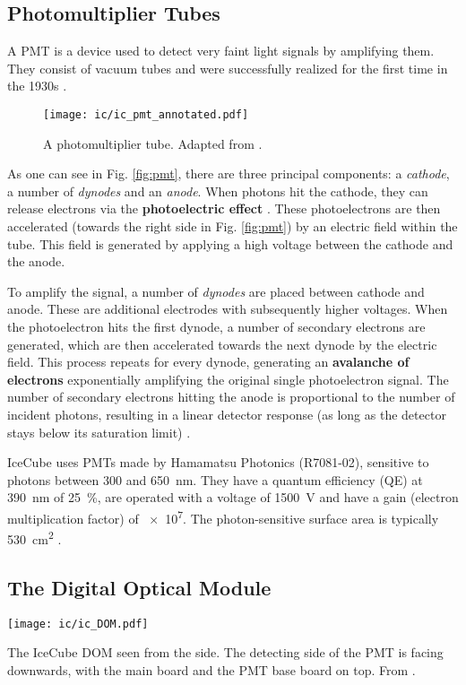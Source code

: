 \subsection{Photomultiplier Tubes}
A PMT is a device used to detect very faint light signals by amplifying them. They consist of vacuum tubes and were successfully realized for the first time in the 1930s .

\begin{figure}[h!]
    \texttt{[image: ic/ic\_pmt\_annotated.pdf]}
    \caption[PMT schematic]{A photomultiplier tube. Adapted from \cite{Bednarski2014}.}
\end{figure}

As one can see in Fig. \ref{fig:pmt}, there are three principal components: a \textit{cathode}, a number of \textit{dynodes} and an \textit{anode}. When photons hit the cathode, they can release electrons via the \textbf{photoelectric effect} . These photoelectrons are then accelerated (towards the right side in Fig. \ref{fig:pmt}) by an electric field within the tube. This field is generated by applying a high voltage between the cathode and the anode.

To amplify the signal, a number of \textit{dynodes} are placed between cathode and anode. These are additional electrodes with subsequently higher voltages. When the photoelectron hits the first dynode, a number of secondary electrons are generated, which are then accelerated towards the next dynode by the electric field. This process repeats for every dynode, generating an \textbf{avalanche of electrons} exponentially amplifying the original single photoelectron signal. The number of secondary electrons hitting the anode is proportional to the number of incident photons, resulting in a linear detector response (as long as the detector stays below its saturation limit) .

IceCube uses PMTs made by Hamamatsu Photonics (R7081-02), sensitive to photons between 300 and \SI{650}{\nm}. They have a quantum efficiency (QE) at \SI{390}{\nm} of \SI{25}{\percent}, are operated with a voltage of \SI{1500}{\V} and have a gain (electron multiplication factor) of \num{e7}. The photon-sensitive surface area is typically \SI{530}{\cm\squared} .

\subsection{The Digital Optical Module} \label{DOM}
\begin{marginfigure}
    \texttt{[image: ic/ic\_DOM.pdf]}
    \caption[IceCube digital optical module]{The IceCube DOM seen from the side. The detecting side of the PMT is facing downwards, with the main board and the PMT base board on top. From \cite{Aartsen2017}.}
\end{marginfigure}

